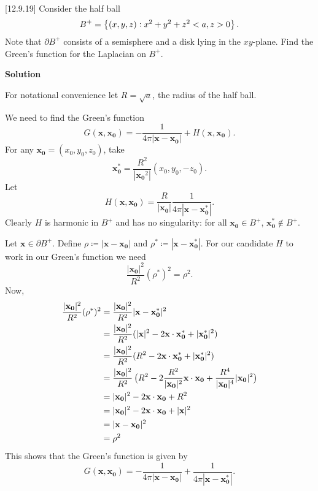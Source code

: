 \documentclass{article}
\def\*#1{\mathbf{#1}}
\begin{document}
[12.9.19] Consider the half ball
%
\begin{equation*}
    B^+ = \cbr[1]{(x, y, z): x^2 + y^2 + z^2 < a, z > 0}
    .
\end{equation*}
%
Note that $\partial B^+$ consists of a semisphere and a disk lying in
the $x y$-plane. Find the Green's function for the Laplacian on $B^+$.

\textbf{Solution}

For notational convenience let $R = \sqrt{a}$, the radius of the half
ball.

We need to find the Green's function
%
\begin{equation*}
    G(\*x, \*{x_0}) = - \frac{1}{4 \pi |\*x - \*{x_0}|} + H(\*x, \*{x_0})
    .
\end{equation*}
%
For any $\*{x_0} = (x_0, y_0, z_0)$, take
%
\begin{equation*}
    \*{x_0^*} = \frac{R^2}{|\*{x_0}^2|} (x_0, y_0, -z_0)
    .
\end{equation*}
%
Let
%
\begin{equation*}
    H(\*{x}, \*{x_0}) = \frac{R}{|\*{x_0}|} \frac{1}{4 \pi |\*x - \*{x_0^*}|}
    .
\end{equation*}
%
Clearly $H$ is harmonic in $B^+$ and has no singularity: for all
$\*{x_0} \in B^+$, $\*{x_0^*} \notin B^+$.

Let $\*x \in \partial B^+$. Define $\rho \coloneqq |\*x - \*{x_0}|$ and
$\rho^* \coloneqq |\*x - \*{x_0^*}|$. For our candidate $H$ to work in
our Green's function we need
%
\begin{equation*}
    \frac{|\*{x_0}|^2}{R^2} (\rho^*)^2 = \rho^2
    .
\end{equation*}
%
Now,
%
\begin{align*}
    \frac{|\*{x_0}|^2}{R^2} (\rho^*)^2
        &= \frac{|\*{x_0}|^2}{R^2} |\*x - \*{x_0^*}|^2 \\
        &= \frac{|\*{x_0}|^2}{R^2} (|\*x|^2 - 2 \*x \cdot \*{x_0^*} + |\*{x_0^*}|^2) \\
        &= \frac{|\*{x_0}|^2}{R^2} (R^2 - 2 \*x \cdot \*{x_0^*} + |\*{x_0^*}|^2) \\
        &= \frac{|\*{x_0}|^2}{R^2} \del[1]{R^2 - 2 \frac{R^2}{|\*{x_0}|^2} \*x \cdot \*{x_0} + \frac{R^4}{|\*{x_0}|^4} |\*{x_0}|^2} \\
        &= |\*{x_0}|^2 - 2 \*x \cdot \*{x_0} + R^2 \\
        &= |\*{x_0}|^2 - 2 \*x \cdot \*{x_0} + |\*x|^2 \\
        &= |\*x - \*{x_0}|^2 \\
        &= \rho^2
\end{align*}
%
This shows that the Green's function is given by
%
\begin{equation*}
    G(\*x, \*{x_0}) = - \frac{1}{4 \pi |\*x - \*{x_0}|} + \frac{1}{4 \pi |\*x - \*{x_0^*}|}
    .
\end{equation*}
\end{document}
